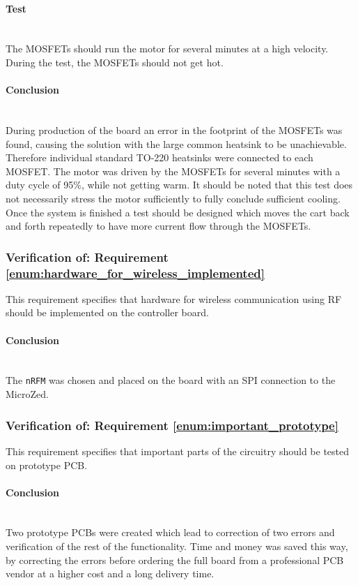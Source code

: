 \paragraph{Test}~\\
The MOSFETs should run the motor for several minutes at a high velocity. 
During the test, the MOSFETs should not get hot.

\paragraph{Conclusion}~\\
During production of the board an error in the footprint of the MOSFETs was found, causing the solution with the large common heatsink to be unachievable.
Therefore individual standard TO-220 heatsinks were connected to each MOSFET.
The motor was driven by the MOSFETs for several minutes with a duty cycle of 95\%, while not getting warm.
It should be noted that this test does not necessarily stress the motor sufficiently to fully conclude sufficient cooling.
Once the system is finished a test should be designed which moves the cart back and  forth repeatedly to have more current flow through the MOSFETs.

\subsubsection{Verification of: Requirement \ref{enum:hardware_for_wireless_implemented}} %
\label{ssub:requirement_enum:hardware_for_wireless_implemented}
This requirement specifies that hardware for wireless communication using RF should be implemented on the controller board.

\paragraph{Conclusion}~\\
The \texttt{nRFM} was chosen and placed on the board with an SPI connection to the MicroZed.

\subsubsection{Verification of: Requirement \ref{enum:important_prototype}} %
\label{ssub:requirement_enum:important_prototype}
This requirement specifies that important parts of the circuitry should be tested on prototype PCB.
\paragraph{Conclusion}~\\
Two prototype PCBs were created which lead to correction of two errors and verification of the rest of the functionality.
Time and money was saved this way, by correcting the errors before ordering the full board from a professional PCB vendor at a higher cost and a long delivery time.
\\~\\

